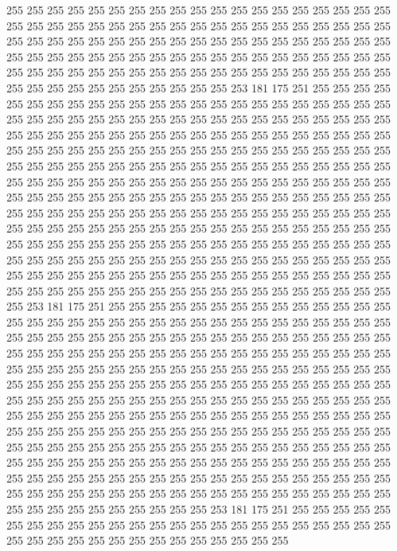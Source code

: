 255 255 255 255 255 255 255 255 255 255 255 255 255 255 255 255 255 255 255 255
255 255 255 255 255 255 255 255 255 255 255 255 255 255 255 255 255 255 255 255
255 255 255 255 255 255 255 255 255 255 255 255 255 255 255 255 255 255 255 255
255 255 255 255 255 255 255 255 255 255 255 255 255 255 255 255 255 255 255 255
255 255 255 255 255 255 255 255 255 255 255 255 255 255 255 255 255 255 255 255
255 255 255 255 255 255 253 181 175 251 255 255 255 255 255 255 255 255 255 255
255 255 255 255 255 255 255 255 255 255 255 255 255 255 255 255 255 255 255 255
255 255 255 255 255 255 255 255 255 255 255 255 255 255 255 255 255 255 255 255
255 255 255 255 255 255 255 255 255 255 255 255 255 255 255 255 255 255 255 255
255 255 255 255 255 255 255 255 255 255 255 255 255 255 255 255 255 255 255 255
255 255 255 255 255 255 255 255 255 255 255 255 255 255 255 255 255 255 255 255
255 255 255 255 255 255 255 255 255 255 255 255 255 255 255 255 255 255 255 255
255 255 255 255 255 255 255 255 255 255 255 255 255 255 255 255 255 255 255 255
255 255 255 255 255 255 255 255 255 255 255 255 255 255 255 255 255 255 255 255
255 255 255 255 255 255 255 255 255 255 255 255 255 255 255 255 255 255 255 255
255 255 255 255 255 255 255 255 255 255 255 255 255 255 255 255 255 255 255 255
255 255 255 255 255 255 255 255 255 255 255 255 255 255 255 255 255 255 255 255
255 255 255 255 255 255 255 255 255 255 255 255 255 255 255 255 255 255 255 255
255 255 253 181 175 251 255 255 255 255 255 255 255 255 255 255 255 255 255 255
255 255 255 255 255 255 255 255 255 255 255 255 255 255 255 255 255 255 255 255
255 255 255 255 255 255 255 255 255 255 255 255 255 255 255 255 255 255 255 255
255 255 255 255 255 255 255 255 255 255 255 255 255 255 255 255 255 255 255 255
255 255 255 255 255 255 255 255 255 255 255 255 255 255 255 255 255 255 255 255
255 255 255 255 255 255 255 255 255 255 255 255 255 255 255 255 255 255 255 255
255 255 255 255 255 255 255 255 255 255 255 255 255 255 255 255 255 255 255 255
255 255 255 255 255 255 255 255 255 255 255 255 255 255 255 255 255 255 255 255
255 255 255 255 255 255 255 255 255 255 255 255 255 255 255 255 255 255 255 255
255 255 255 255 255 255 255 255 255 255 255 255 255 255 255 255 255 255 255 255
255 255 255 255 255 255 255 255 255 255 255 255 255 255 255 255 255 255 255 255
255 255 255 255 255 255 255 255 255 255 255 255 255 255 255 255 255 255 255 255
255 255 255 255 255 255 255 255 255 255 255 255 255 255 255 255 255 255 253 181
175 251 255 255 255 255 255 255 255 255 255 255 255 255 255 255 255 255 255 255
255 255 255 255 255 255 255 255 255 255 255 255 255 255 255 255 255 255 255 255
